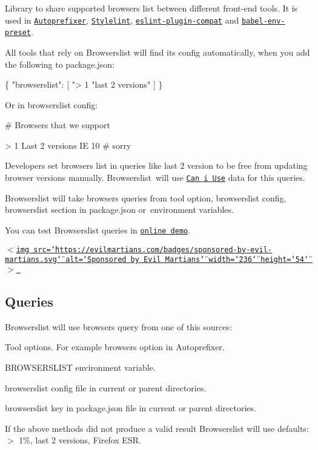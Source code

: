 Library to share supported browsers list between different front-\/end tools. It is used in \href{https://github.com/postcss/autoprefixer}{\tt Autoprefixer}, \href{http://stylelint.io/}{\tt Stylelint}, \href{https://github.com/amilajack/eslint-plugin-compat}{\tt eslint-\/plugin-\/compat} and \href{https://github.com/babel/babel-preset-env}{\tt babel-\/env-\/preset}.

All tools that rely on Browserslist will find its config automatically, when you add the following to {\ttfamily package.\+json}\+:


\begin{DoxyCode}
\{
  "browserslist": [
    "> 1%
    "last 2 versions"
  ]
\}
\end{DoxyCode}


Or in {\ttfamily browserslist} config\+:


\begin{DoxyCode}
# Browsers that we support

> 1%
Last 2 versions
IE 10 # sorry
\end{DoxyCode}


Developers set browsers list in queries like {\ttfamily last 2 version} to be free from updating browser versions manually. Browserslist will use \href{http://caniuse.com/}{\tt Can i Use} data for this queries.

Browserslist will take browsers queries from tool option, {\ttfamily browserslist} config, {\ttfamily browserslist} section in {\ttfamily package.\+json} or environment variables.

You can test Browserslist queries in \href{http://browserl.ist/}{\tt online demo}.

\href{https://evilmartians.com/?utm_source=browserslist}{\tt $<$img src=\char`\"{}https\+://evilmartians.\+com/badges/sponsored-\/by-\/evil-\/martians.\+svg\char`\"{} alt=\char`\"{}\+Sponsored by Evil Martians\char`\"{} width=\char`\"{}236\char`\"{} height=\char`\"{}54\char`\"{} $>$ }

\subsection*{Queries}

Browserslist will use browsers query from one of this sources\+:


\begin{DoxyEnumerate}
\item Tool options. For example {\ttfamily browsers} option in Autoprefixer.
\item {\ttfamily B\+R\+O\+W\+S\+E\+R\+S\+L\+I\+ST} environment variable.
\item {\ttfamily browserslist} config file in current or parent directories.
\item {\ttfamily browserslist} key in {\ttfamily package.\+json} file in current or parent directories.
\item If the above methods did not produce a valid result Browserslist will use defaults\+: {\ttfamily $>$ 1\%, last 2 versions, Firefox E\+SR}.
\end{DoxyEnumerate}

